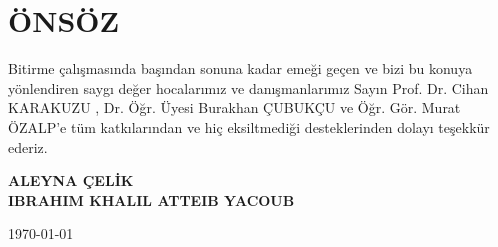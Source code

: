 \section*{ÖNSÖZ}
Bitirme çalışmasında başından sonuna kadar emeği geçen ve bizi bu konuya yönlendiren saygı değer hocalarımız ve danışmanlarımız Sayın Prof. Dr. Cihan KARAKUZU , Dr. Öğr. Üyesi Burakhan ÇUBUKÇU ve 
Öğr. Gör. Murat ÖZALP'e tüm katkılarından ve hiç eksiltmediği desteklerinden dolayı teşekkür ederiz.

\begin{flushright}
\textbf{ALEYNA ÇELİK \\ IBRAHIM KHALIL ATTEIB YACOUB}

\today
\end{flushright}